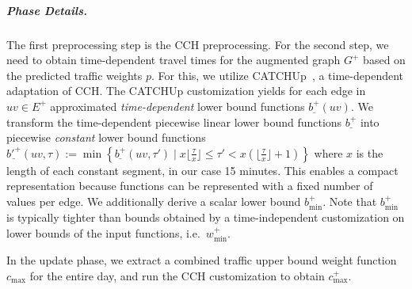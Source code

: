 \documentclass[a4paper,UKenglish,cleveref, autoref, thm-restate,anonymous]{lipics-v2021}
\newcommand*{\comb}{c}
\newcommand*{\pcfn}{\underline{b'^+}}
\newcommand*{\bucketlen}{x}
\begin{document}
\subparagraph{Phase Details.}
The first preprocessing step is the CCH preprocessing.
For the second step, we need to obtain time-dependent travel times for the augmented graph $G^+$ based on the predicted traffic weights $p$.
For this, we utilize CATCHUp~\cite{swz-sfert-21}, a time-dependent adaptation of CCH.
The CATCHUp customization yields for each edge in $uv \in E^+$ approximated \emph{time-dependent} lower bound functions $\underline{b^+}(uv)$.
We transform the time-dependent piecewise linear lower bound functions $\underline{b^+}$ into piecewise \emph{constant} lower bound functions
$\pcfn(uv, \tau) := \min \left\{ \underline{b^+}(uv, \tau') \mid \bucketlen  \lfloor \frac{\tau}{\bucketlen} \rfloor \leq \tau' < \bucketlen (\lfloor \frac{\tau}{\bucketlen} \rfloor + 1) \right\}$
where $\bucketlen$ is the length of each constant segment, in our case 15 minutes.
This enables a compact representation because functions can be represented with a fixed number of values per edge.
We additionally derive a scalar lower bound $b^+_{\min}$.
Note that $b^+_{\min}$ is typically tighter than bounds obtained by a time-independent customization on lower bounds of the input functions, i.e.\ $w^+_{\min}$.

In the update phase, we extract a combined traffic upper bound weight function $\comb_{\max}$ for the entire day, and run the CCH customization to obtain $\comb^+_{\max}$.
\end{document}
